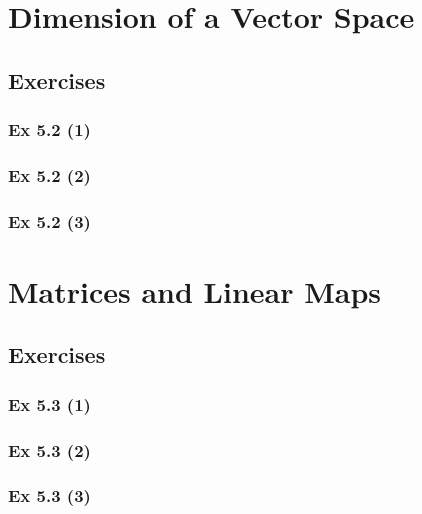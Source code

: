 \newpage		%

\section{Dimension of a Vector Space}\label{sec:5.2}
\subsection{Exercises}\label{sec:5.2_Exercises}

\subsubsection{Ex 5.2 (1)}\label{sec:Ex_5.2.1}

\subsubsection{Ex 5.2 (2)}\label{sec:Ex_5.2.2}

\subsubsection{Ex 5.2 (3)}\label{sec:Ex_5.2.3}

\newpage		%

\section{Matrices and Linear Maps}\label{sec:5.3}
\subsection{Exercises}\label{sec:5.3_Exercises}

\subsubsection{Ex 5.3 (1)}\label{sec:Ex_5.3.1}

\subsubsection{Ex 5.3 (2)}\label{sec:Ex_5.3.2}

\subsubsection{Ex 5.3 (3)}\label{sec:Ex_5.3.3}

